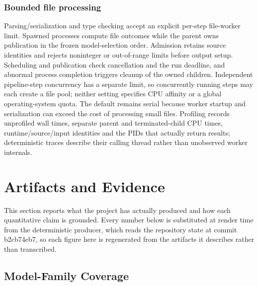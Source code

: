 \documentclass[
  english,
  9pt,
]{extarticle}
\begin{document}
\subsubsection{Bounded file processing}\label{bounded-file-processing}

Parsing/serialization and type checking accept an explicit per-step
file-worker limit. Spawned processes compute file outcomes while the
parent owns publication in the frozen model-selection order. Admission
retains source identities and rejects noninteger or out-of-range limits
before output setup. Scheduling and publication check cancellation and
the run deadline, and abnormal process completion triggers cleanup of
the owned children. Independent pipeline-step concurrency has a separate
limit, so concurrently running steps may each create a file pool;
neither setting specifies CPU affinity or a global operating-system
quota. The default remains serial because worker startup and
serialization can exceed the cost of processing small files. Profiling
records unprofiled wall times, separate parent and terminated-child CPU
times, runtime/source/input identities and the PIDs that actually return
results; deterministic traces describe their calling thread rather than
unobserved worker internals.

\newpage

\section{Artifacts and Evidence}\label{sec:artifacts_evidence}

This section reports what the project has actually produced and how each
quantitative claim is grounded. Every number below is substituted at
render time from the deterministic producer, which reads the repository
state at commit b2cb74eb7, so each figure here is regenerated from the
artifacts it describes rather than transcribed.

\subsection{Model-Family Coverage}\label{model-family-coverage}
\end{document}

